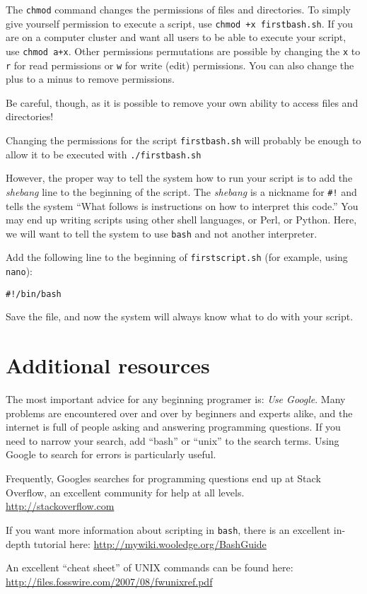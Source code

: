 \documentclass[11pt, oneside]{article}   	%
\newcounter{bash}
\begin{document}
The \verb+chmod+ command changes the permissions of files and directories.
To simply give yourself permission to execute a script, use \verb-chmod +x firstbash.sh-.
If you are on a computer cluster and want all users to be able to execute your script, use \verb-chmod a+x-.
Other permissions permutations are possible by changing the \verb+x+ to \verb+r+ for read permissions or \verb+w+ for write (edit) permissions.
You can also change the plus to a minus to remove permissions.

Be careful, though, as it is possible to remove your own ability to access files and directories!

Changing the permissions for the script \verb+firstbash.sh+ will probably be enough to allow it to be executed with \verb+./firstbash.sh+

However, the proper way to tell the system how to run your script is to add the \emph{shebang} line to the beginning of the script.
The \emph{shebang} is a nickname for \verb+#!+ and tells the system ``What follows is instructions on how to interpret this code.''
You may end up writing scripts using other shell languages, or Perl, or Python.
Here, we will want to tell the system to use \verb+bash+ and not another interpreter. 

Add the following line to the beginning of \verb+firstscript.sh+ (for example, using \verb+nano+):

\verb+#!/bin/bash+

Save the file, and now the system will always know what to do with your script.

\section{Additional resources}
The most important advice for any beginning programer is: \emph{Use Google}.
Many problems are encountered over and over by beginners and experts alike, and the internet is full of people asking and answering programming questions.
If you need to narrow your search, add ``bash'' or ``unix'' to the search terms.
Using Google to search for errors is particularly useful.

Frequently, Googles searches for programming questions end up at Stack Overflow, an excellent community for help at all levels.\\ \url{http://stackoverflow.com}

If you want more information about scripting in \verb+bash+, there is an excellent in-depth tutorial here: \url{http://mywiki.wooledge.org/BashGuide}

An excellent ``cheat sheet'' of UNIX commands can be found here:\\	 \url{http://files.fosswire.com/2007/08/fwunixref.pdf}


\renewcommand{\nomname}{List of commands}
\printnomenclature
\end{document}
